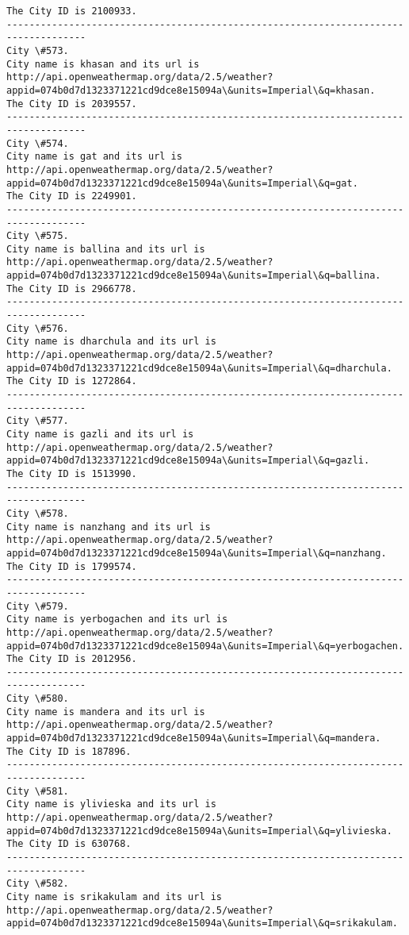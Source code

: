 \documentclass[11pt]{article}
\begin{document}
\begin{Verbatim}[commandchars=\\\{\}]
The City ID is 2100933.
------------------------------------------------------------------------------------
City \#573.
City name is khasan and its url is http://api.openweathermap.org/data/2.5/weather?appid=074b0d7d1323371221cd9dce8e15094a\&units=Imperial\&q=khasan.
The City ID is 2039557.
------------------------------------------------------------------------------------
City \#574.
City name is gat and its url is http://api.openweathermap.org/data/2.5/weather?appid=074b0d7d1323371221cd9dce8e15094a\&units=Imperial\&q=gat.
The City ID is 2249901.
------------------------------------------------------------------------------------
City \#575.
City name is ballina and its url is http://api.openweathermap.org/data/2.5/weather?appid=074b0d7d1323371221cd9dce8e15094a\&units=Imperial\&q=ballina.
The City ID is 2966778.
------------------------------------------------------------------------------------
City \#576.
City name is dharchula and its url is http://api.openweathermap.org/data/2.5/weather?appid=074b0d7d1323371221cd9dce8e15094a\&units=Imperial\&q=dharchula.
The City ID is 1272864.
------------------------------------------------------------------------------------
City \#577.
City name is gazli and its url is http://api.openweathermap.org/data/2.5/weather?appid=074b0d7d1323371221cd9dce8e15094a\&units=Imperial\&q=gazli.
The City ID is 1513990.
------------------------------------------------------------------------------------
City \#578.
City name is nanzhang and its url is http://api.openweathermap.org/data/2.5/weather?appid=074b0d7d1323371221cd9dce8e15094a\&units=Imperial\&q=nanzhang.
The City ID is 1799574.
------------------------------------------------------------------------------------
City \#579.
City name is yerbogachen and its url is http://api.openweathermap.org/data/2.5/weather?appid=074b0d7d1323371221cd9dce8e15094a\&units=Imperial\&q=yerbogachen.
The City ID is 2012956.
------------------------------------------------------------------------------------
City \#580.
City name is mandera and its url is http://api.openweathermap.org/data/2.5/weather?appid=074b0d7d1323371221cd9dce8e15094a\&units=Imperial\&q=mandera.
The City ID is 187896.
------------------------------------------------------------------------------------
City \#581.
City name is ylivieska and its url is http://api.openweathermap.org/data/2.5/weather?appid=074b0d7d1323371221cd9dce8e15094a\&units=Imperial\&q=ylivieska.
The City ID is 630768.
------------------------------------------------------------------------------------
City \#582.
City name is srikakulam and its url is http://api.openweathermap.org/data/2.5/weather?appid=074b0d7d1323371221cd9dce8e15094a\&units=Imperial\&q=srikakulam.

\end{Verbatim}
\end{document}
